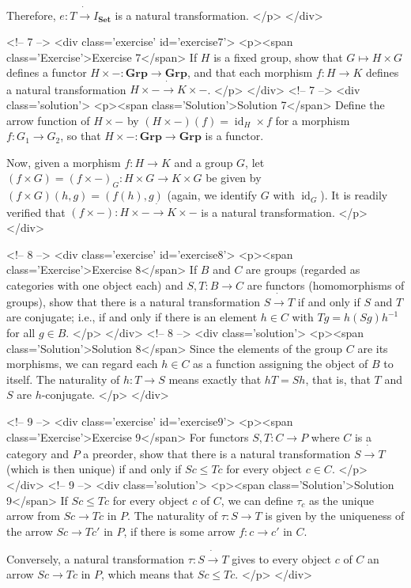 Therefore, $e:T\dot{\to}I_\mathbf{Set}$ is a natural transformation.
</p>
</div>

<!-- 7 -->
<div class='exercise' id='exercise7'>
<p><span class='Exercise'>Exercise 7</span>
If $H$ is a fixed group, show that $G\mapsto H\times G$ defines a functor $H\times -:\mathbf{Grp}\to\mathbf{Grp}$, and that each morphism $f:H\to K$ defines a natural transformation $H\times -\dot{\to}K\times -$.
</p>
</div>
<!-- 7 -->
<div class='solution'>
<p><span class='Solution'>Solution 7</span>
Define the arrow function of $H\times -$ by $(H\times -)(f)=\operatorname{id}_H\times f$ for a morphism $f:G_1\to G_2$, so that $H\times -:\mathbf{Grp}\to\mathbf{Grp}$ is a functor.

Now, given a morphism $f:H\to K$ and a group $G$, let $(f\times G)=(f\times -)_G:H\times G\to K\times G$ be given by $(f\times G)(h,g)=(f(h),g)$ (again, we identify $G$ with $\operatorname{id}_G$). It is readily verified that $(f\times -):H\times -\dot{\to}K\times -$ is a natural transformation.
</p>
</div>

<!-- 8 -->
<div class='exercise' id='exercise8'>
<p><span class='Exercise'>Exercise 8</span>
If $B$ and $C$ are groups (regarded as categories with one object each) and $S,T:B\to C$ are functors (homomorphisms of groups), show that there is a natural transformation $S\dot{\to} T$ if and only if $S$ and $T$ are conjugate; i.e., if and only if there is an element $h\in C$ with $Tg=h(Sg)h^{-1}$ for all $g\in B$.
</p>
</div>
<!-- 8 -->
<div class='solution'>
<p><span class='Solution'>Solution 8</span>
Since the elements of the group $C$ are its morphisms, we can regard each $h\in C$ as a function assigning the object of $B$ to itself. The naturality of $h:T\to S$ means exactly that $hT=Sh$, that is, that $T$ and $S$ are $h$-conjugate.
</p>
</div>

<!-- 9 -->
<div class='exercise' id='exercise9'>
<p><span class='Exercise'>Exercise 9</span>
For functors $S,T:C\to P$ where $C$ is a category and $P$ a preorder, show that there is a natural transformation $S\dot{\to}T$ (which is then unique) if and only if $Sc\leq Tc$ for every object $c\in C$.
</p>
</div>
<!-- 9 -->
<div class='solution'>
<p><span class='Solution'>Solution 9</span>
If $Sc\leq Tc$ for every object $c$ of $C$, we can define $\tau_c$ as the unique arrow from $Sc\to Tc$ in $P$. The naturality of $\tau:S\to T$ is given by the uniqueness of the arrow $Sc\to Tc'$ in $P$, if there is some arrow $f:c\to c'$ in $C$.

Conversely, a natural transformation $\tau:S\dot{\to}T$ gives to every object $c$ of $C$ an arrow $Sc\to Tc$ in $P$, which means that $Sc\leq Tc$.
</p>
</div>

